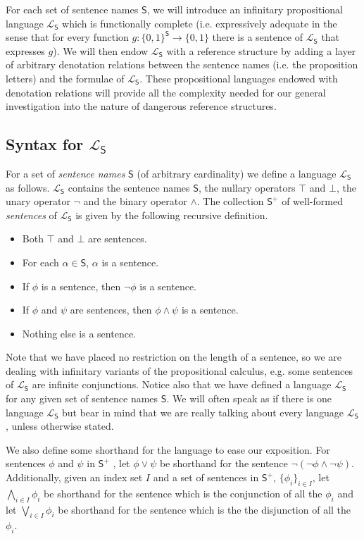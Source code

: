 \documentclass[12pt]{article}
\theoremstyle{remark}
\newcommand{\prg}{\hspace{0.25in}}
\newcommand{\fancy}[1]{\mathcal{#1}}
\def\S{\textsf{S}}
\def\L{\fancy{L}}
\begin{document}
For each set of sentence names $\S$, we will introduce an infinitary propositional language $\L_\S$ which is functionally complete (i.e. expressively adequate in the sense that for every function $g: \{0,1\}^{\S} \rightarrow \{0,1\}$ there is a sentence of $\L_\S$ that expresses $g$). We will then endow $\L_\S$ with a reference structure by adding a layer of arbitrary denotation relations between the sentence names (i.e. the proposition letters) and the formulae of $\L_\S$. These propositional languages endowed with denotation relations will provide all the complexity needed for our general investigation into the nature of dangerous reference structures.

\subsection{Syntax for $\L_\S$}

\noindent For a set of \textit{sentence names} $\S$ (of arbitrary cardinality) we define a language $\L_\S$ as follows. $\L_\S$ contains the sentence names $\S$, the nullary operators $\top$ and $\bot$, the unary operator $\neg$ and the binary operator $\wedge$.  The collection $\S^{+}$ of well-formed \textit{sentences} of $\L_\S$ is given by the following recursive definition.

\begin{itemize}
\item Both $\top$ and $\bot$ are sentences. 
\item For each $\alpha \in \S$, $\alpha$ is a sentence.
\item If $\phi$ is a sentence, then $\neg \phi$ is a sentence.
\item If $\phi$ and $\psi$ are sentences, then $\phi \wedge \psi$ is a sentence.
\item Nothing else is a sentence.
\end{itemize}

Note that we have placed no restriction on the length of a sentence, so we are dealing with infinitary variants of the propositional calculus, e.g. some sentences of $\L_\S$ are infinite conjunctions. Notice also that we have defined a language $\L_\S$ for any given set of sentence names $\S$. We will often speak as if there is one language $\L_\S$ but bear in mind that we are really talking about every language $\L_\S$, unless otherwise stated.

\prg We also define some shorthand for the language to ease our exposition.  For sentences $\phi$ and $\psi$ in $\S^{+}$ , let $\phi \vee \psi$ be shorthand for the sentence $\neg (\neg \phi \wedge \neg \psi)$.  Additionally, given an index set $I$ and a set of sentences in $\S^{+}$, $\{\phi_i\}_{i \in I}$, let $\bigwedge_{i \in I} \phi_i$ be shorthand for the sentence which is the conjunction of all the $\phi_i$ and let $\bigvee_{i \in I} \phi_i$ be shorthand for the sentence which is the  the disjunction of all the $\phi_i$.
\end{document}

